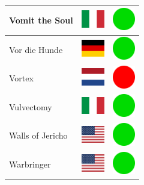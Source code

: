 \documentclass[12pt, a4paper, twoside]{report}
\begin{document}
\begin{center}
\begin{longtable}{|p{5cm}|p{2cm}|p{2cm}|}
Vomit the Soul & \includegraphics[width=1cm]{4x3/it} & \includegraphics[width=1cm]{likes/y} \\ \hline
Vor die Hunde & \includegraphics[width=1cm]{4x3/de} & \includegraphics[width=1cm]{likes/y} \\ \hline
Vortex & \includegraphics[width=1cm]{4x3/nl} & \includegraphics[width=1cm]{likes/n} \\ \hline
Vulvectomy & \includegraphics[width=1cm]{4x3/it} & \includegraphics[width=1cm]{likes/y} \\ \hline
Walls of Jericho & \includegraphics[width=1cm]{4x3/us} & \includegraphics[width=1cm]{likes/y} \\ \hline
Warbringer & \includegraphics[width=1cm]{4x3/us} & \includegraphics[width=1cm]{likes/y} \\ \hline

\end{longtable}
\end{center}
\end{document}
